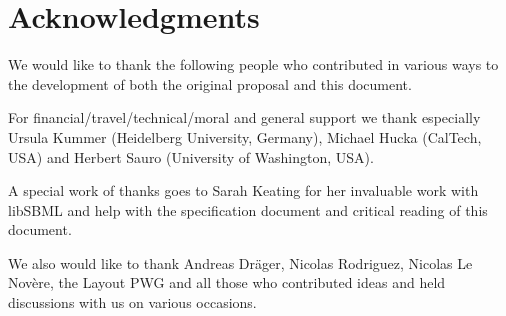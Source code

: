 
\section{Acknowledgments}

We would like to thank the following people who contributed in various ways to the development of both the original proposal and this document.

For financial/travel/technical/moral and general support we thank especially Ursula Kummer (Heidelberg University, Germany), Michael Hucka (CalTech, USA) and Herbert Sauro (University of Washington, USA).

A special work of thanks goes to Sarah Keating for her invaluable work with  \textsf{libSBML} and help with the specification document and critical reading of this document.

We also would like to thank Andreas Dr\"{a}ger, Nicolas Rodriguez,  Nicolas Le Nov\`{e}re, the Layout PWG and all those who contributed ideas and held discussions with us on various occasions.

